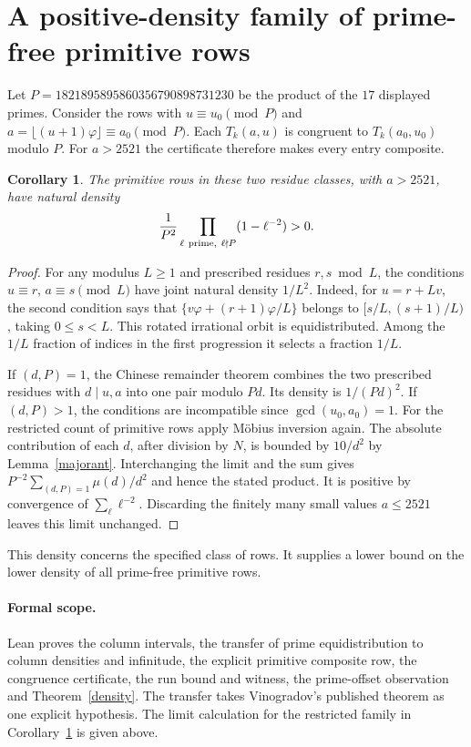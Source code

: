 \documentclass[11pt]{article}
\newtheorem{corollary}[theorem]{Corollary}
\newcommand{\ph}{\varphi}
\newcommand{\fl}[1]{\lfloor #1\rfloor}
\begin{document}
\section{A positive-density family of prime-free primitive rows}
Let $P=1821895895860356790898731230$ be the product of the $17$ displayed
primes. Consider the rows with $u\equiv u_0\pmod P$ and
$a=\fl{(u+1)\ph}\equiv a_0\pmod P$. Each $T_k(a,u)$ is congruent to
$T_k(a_0,u_0)$ modulo $P$. For $a>2521$ the certificate therefore makes
every entry composite.

\begin{corollary}\label{family}
The primitive rows in these two residue classes, with $a>2521$, have
natural density
\[
 \frac1{P^2}\prod_{\ell\ {\rm prime},\ \ell\nmid P}(1-\ell^{-2})>0 .
\]
\end{corollary}
\begin{proof}
For any modulus $L\ge1$ and prescribed residues $r,s\bmod L$, the conditions
$u\equiv r$, $a\equiv s\pmod L$ have joint natural density $1/L^2$.
Indeed, for $u=r+Lv$, the second condition says that
$\{v\ph+(r+1)\ph/L\}$ belongs to $[s/L,(s+1)/L)$, taking
$0\le s<L$. This rotated irrational orbit is equidistributed. Among the
$1/L$ fraction of indices in the first progression it selects a fraction
$1/L$.

If $(d,P)=1$, the Chinese remainder theorem combines the two prescribed
residues with $d\mid u,a$ into one pair modulo $Pd$. Its density is
$1/(Pd)^2$. If $(d,P)>1$, the conditions are incompatible since
$\gcd(u_0,a_0)=1$. For the restricted count of primitive rows apply
Möbius inversion again. The absolute contribution of each $d$, after
division by $N$, is bounded by $10/d^2$ by Lemma~\ref{majorant}.
Interchanging the limit and the sum gives
$P^{-2}\sum_{(d,P)=1}\mu(d)/d^2$ and hence the stated product.
It is positive by convergence of $\sum_{\ell}\ell^{-2}$. Discarding the
finitely many small values $a\le2521$ leaves this limit unchanged.
\end{proof}
This density concerns the specified class of rows. It supplies a lower bound
on the lower density of all prime-free primitive rows.

\paragraph{Formal scope.}
Lean proves the column intervals, the transfer of prime equidistribution to
column densities and infinitude, the explicit primitive composite row, the
congruence certificate, the run bound and witness, the prime-offset observation
and Theorem~\ref{density}. The transfer takes Vinogradov's published theorem
as one explicit hypothesis. The limit calculation for the restricted family
in Corollary~\ref{family} is given above.
\end{document}
